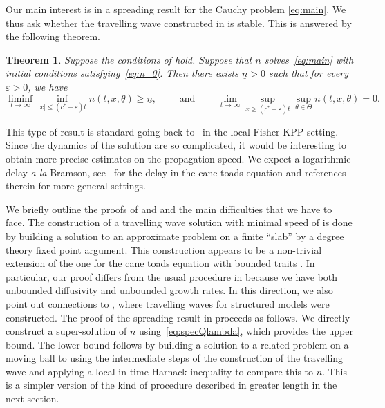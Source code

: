 \documentclass[11pt]{article}    %
\newtheorem{theorem}{Theorem}
\renewcommand{\epsilon}{\varepsilon}
\begin{document}
Our main interest is in a spreading result for the Cauchy problem \eqref{eq:main}. We thus ask whether the travelling wave constructed in  is stable.  This is answered by the following theorem.
\begin{theorem}\label{thm:cauchy_finite}
	Suppose the conditions of  hold. Suppose that $n$ solves~\eqref{eq:main} with initial conditions satisfying~\eqref{eq:n_0}.  Then there exists $\underline n>0$ such that for every $\epsilon >0$, we have
	\[
		\liminf_{t\to\infty} \inf_{|x|\leq (c^*-\epsilon)t} n(t,x,\underline\theta) \geq \underline n,
			\qquad\text{ and }\qquad
			\lim_{t\to\infty}\sup_{x\geq (c^* + \epsilon)t} \sup_{\theta \in\Theta} n(t,x,\theta) = 0.
	\]
\end{theorem}
This type of result is standard going back to~\cite{AronsonWeinberger2} in the local Fisher-KPP setting. Since the dynamics of the solution are so complicated, it would be interesting to obtain more precise estimates on the propagation speed.  We expect a logarithmic delay {\em a la} Bramson, see~\cite{BHR_LogDelay} for the delay in the cane toads equation and references therein for more general settings.

We briefly outline the proofs of  and  and the main difficulties that we have to face.  The construction of a travelling wave solution with minimal speed of  is done by building a solution to an approximate problem on a finite ``slab'' by a degree theory fixed point argument. This construction appears to be a non-trivial extension of the one for the cane toads equation with bounded traits \cite{BouinCalvez}. In particular, our proof differs from the usual procedure in \cite{BouinCalvez} because we have both unbounded diffusivity and unbounded growth rates. In this direction, we also point out connections to \cite{AlfaroBerestyckiRaoul,AlfaroCovilleRaoul,BerestyckiJinSilvestre},  where travelling waves for structured models were constructed.  The proof of the spreading result in  proceeds as follows. We directly construct a super-solution of $n$ using~\eqref{eq:specQlambda}, which provides the upper bound. %
The lower bound follows by building a solution to a related problem on a moving ball to using the intermediate steps of the construction of the travelling wave and applying a local-in-time Harnack inequality to compare this to $n$. This is a simpler version of the kind of procedure described in greater length in the next section.
\end{document}
